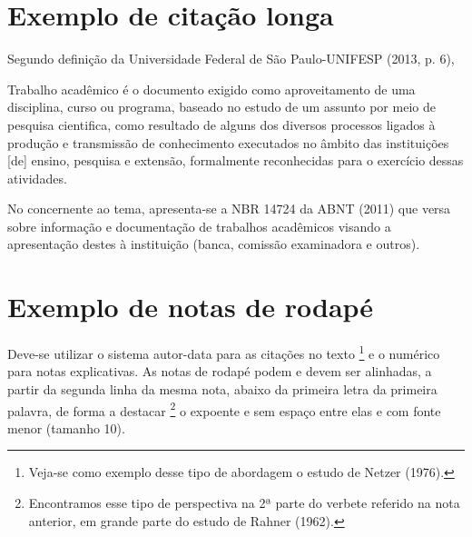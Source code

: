 \lipsum[3]

\section{Exemplo de citação longa}

Segundo definição da Universidade Federal de São Paulo-UNIFESP (2013, p. 6),

\begin{citacao}
Trabalho acadêmico é o documento exigido como aproveitamento de uma disciplina, curso ou programa, baseado no estudo de um assunto por meio de pesquisa cientifica, como resultado de alguns dos diversos processos ligados à produção e transmissão de conhecimento executados no âmbito das instituições [de] ensino, pesquisa e extensão, formalmente reconhecidas para o exercício dessas atividades.
\end{citacao}

No concernente ao tema, apresenta-se a NBR 14724 da ABNT (2011) que versa sobre informação e documentação de trabalhos acadêmicos visando a apresentação destes à instituição (banca, comissão examinadora e outros).

\section{Exemplo de notas de rodapé}

Deve-se utilizar o sistema autor-data para as citações no texto \footnote{Veja-se como exemplo desse tipo de abordagem o estudo de Netzer (1976).}
 e o numérico para notas explicativas. As notas de rodapé podem e devem ser alinhadas, a partir da segunda linha da mesma nota, abaixo da primeira letra da primeira palavra, de forma a destacar \footnote{Encontramos esse tipo de perspectiva na 2ª parte do verbete referido na nota anterior, em grande parte do estudo de Rahner (1962).} o expoente e sem espaço entre elas e com fonte menor (tamanho 10).
